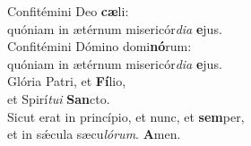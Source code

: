 \evenverse Confitémini Deo \textbf{cæ}li:~\*\\
\evenverse quóniam in ætérnum misericór\textit{di}\textit{a} \textbf{e}jus.\\
\oddverse Confitémini Dómino domi\textbf{nó}rum:~\*\\
\oddverse quóniam in ætérnum misericór\textit{di}\textit{a} \textbf{e}jus.\\
\evenverse Glória Patri, et \textbf{Fí}lio,~\*\\
\evenverse et Spirí\textit{tu}\textit{i} \textbf{San}cto.\\
\oddverse Sicut erat in princípio, et nunc, et \textbf{sem}per,~\*\\
\oddverse et in sǽcula sæcu\textit{ló}\textit{rum}. \textbf{A}men.\\
